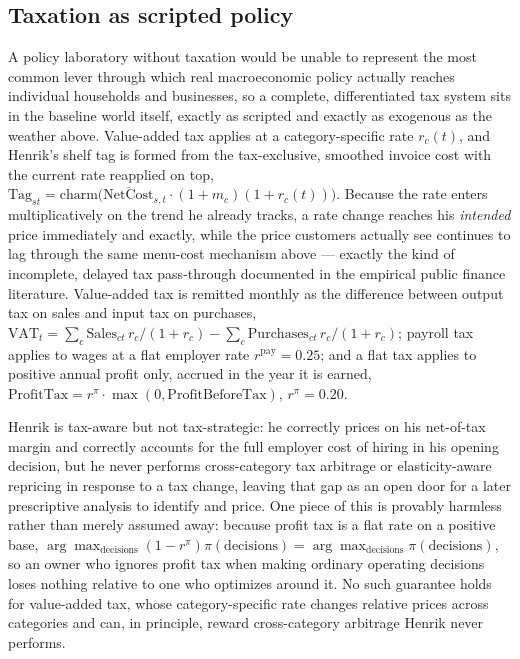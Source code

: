 \documentclass[12pt,a4paper]{article}
\begin{document}
\subsection{Taxation as scripted policy}
\label{sec:macro-tax}

A policy laboratory without taxation would be unable to represent the
most common lever through which real macroeconomic policy actually
reaches individual households and businesses, so a complete, differentiated
tax system sits in the baseline world itself, exactly as scripted and
exactly as exogenous as the weather above. Value-added tax applies at a
category-specific rate $r_c(t)$, and Henrik's shelf tag is formed from
the tax-exclusive, smoothed invoice cost with the current rate reapplied
on top, $\text{Tag}_{st} = \text{charm}\big(\overline{\text{NetCost}}_{s,t}
\cdot (1+m_c)(1+r_c(t))\big)$. Because the rate enters multiplicatively
on the trend he already tracks, a rate change reaches his \emph{intended}
price immediately and exactly, while the price customers actually see
continues to lag through the same menu-cost mechanism above --- exactly
the kind of incomplete, delayed tax pass-through documented in the
empirical public finance literature. Value-added tax is remitted monthly
as the difference between output tax on sales and input tax on
purchases, $\text{VAT}_t = \sum_c \text{Sales}_{ct}\,r_c/(1+r_c) -
\sum_c \text{Purchases}_{ct}\,r_c/(1+r_c)$; payroll tax applies to wages
at a flat employer rate $r^{\text{pay}}=0.25$; and a flat tax applies to
positive annual profit only, accrued in the year it is earned,
$\text{ProfitTax} = r^{\pi}\cdot\max(0,\text{ProfitBeforeTax})$,
$r^\pi=0.20$.

Henrik is tax-aware but not tax-strategic: he correctly prices on his
net-of-tax margin and correctly accounts for the full employer cost of
hiring in his opening decision, but he never performs cross-category tax
arbitrage or elasticity-aware repricing in response to a tax change,
leaving that gap as an open door for a later prescriptive analysis to
identify and price. One piece of this is provably harmless rather than
merely assumed away: because profit tax is a flat rate on a positive
base, $\arg\max_{\text{decisions}} (1-r^\pi)\pi(\text{decisions}) =
\arg\max_{\text{decisions}} \pi(\text{decisions})$, so an owner who
ignores profit tax when making ordinary operating decisions loses
nothing relative to one who optimizes around it. No such guarantee holds
for value-added tax, whose category-specific rate changes relative
prices across categories and can, in principle, reward cross-category
arbitrage Henrik never performs.
\end{document}
